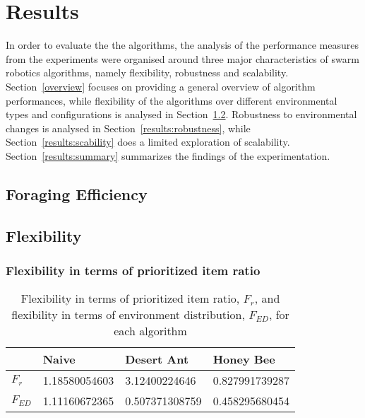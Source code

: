 \chapter{Results}
\label{chap:results}



In order to evaluate the the algorithms, the analysis of the performance measures from the experiments were organised around three major characteristics of swarm robotics algorithms, namely flexibility, robustness and scalability. Section~\ref{overview} focuses on providing a general overview of algorithm performances, while flexibility of the algorithms over different environmental types and configurations is analysed in Section~\ref{results:flexibility}. Robustness to environmental changes is analysed in Section~\ref{results:robustness}, while Section~\ref{results:scability} does a limited exploration of scalability. Section~\ref{results:summary} summarizes the findings of the experimentation. 

\section{Foraging Efficiency}
\label{efficiency}




\section{Flexibility}
\label{results:flexibility}



\subsection{Flexibility in terms of prioritized item ratio}
\label{results:prioritizeditemratio}

\begin{table}[]
\centering
\caption{Flexibility in terms of prioritized item ratio, $F_r$, and flexibility in terms of environment distribution, $F_{ED}$, for each algorithm}
\label{table:flexibility}
\begin{tabular}{@{}llll@{}}
\toprule
\textbf{}         & Naive         & Desert Ant        & Honey Bee         \\ \midrule
\textbf{$F_r$}    & 1.18580054603 & 3.12400224646     & 0.827991739287    \\ \midrule
\textbf{$F_{ED}$} & 1.11160672365 & 0.507371308759 & 0.458295680454 
\end{tabular}
\end{table}

